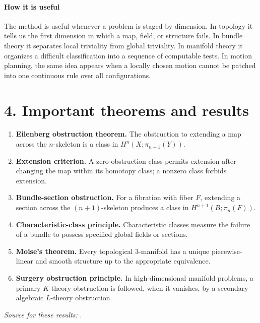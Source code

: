 \paragraph{How it is useful}
The method is useful whenever a problem is staged by dimension. In topology it tells us the first dimension in which a map, field, or structure fails. In bundle theory it separates local triviality from global triviality. In manifold theory it organizes a difficult classification into a sequence of computable tests. In motion planning, the same idea appears when a locally chosen motion cannot be patched into one continuous rule over all configurations.

\section*{4. Important theorems and results}
\begin{enumerate}[leftmargin=*,itemsep=0.35em]
\item \textbf{Eilenberg obstruction theorem.} The obstruction to extending a map across the $n$-skeleton is a class in $H^n(X;\pi_{n-1}(Y))$.

\item \textbf{Extension criterion.} A zero obstruction class permits extension after changing the map within its homotopy class; a nonzero class forbids extension.

\item \textbf{Bundle-section obstruction.} For a fibration with fiber $F$, extending a section across the $(n+1)$-skeleton produces a class in $H^{n+1}(B;\pi_n(F))$.

\item \textbf{Characteristic-class principle.} Characteristic classes measure the failure of a bundle to possess specified global fields or sections.

\item \textbf{Moise's theorem.} Every topological $3$-manifold has a unique piecewise-linear and smooth structure up to the appropriate equivalence.

\item \textbf{Surgery obstruction principle.} In high-dimensional manifold problems, a primary $K$-theory obstruction is followed, when it vanishes, by a secondary algebraic $L$-theory obstruction.
\end{enumerate}
\noindent\emph{Source for these results:} \cite{obstruction_theory_ref1}.

